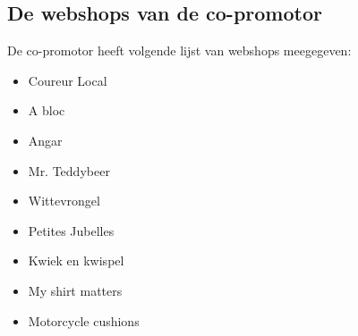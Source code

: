\subsection{De webshops van de co-promotor}
De co-promotor heeft volgende lijst van webshops meegegeven:
\begin{itemize}
    \item Coureur Local
    \item A bloc
    \item Angar
    \item Mr. Teddybeer
    \item Wittevrongel
    \item Petites Jubelles
    \item Kwiek en kwispel
    \item My shirt matters
    \item Motorcycle cushions
\end{itemize} 

